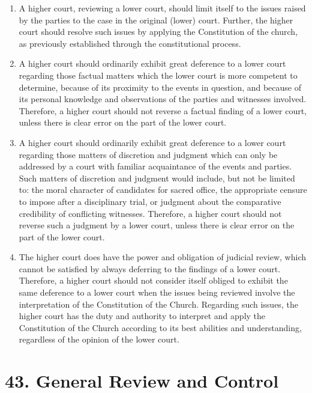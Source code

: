 \documentclass[
]{book}
\providecommand{\tightlist}{%
  \setlength{\itemsep}{0pt}\setlength{\parskip}{0pt}}
\begin{document}
\begin{enumerate}
  \begin{enumerate}
  \def\labelenumii{\alph{enumii}.}
  \tightlist
  \item
    A higher court, reviewing a lower court, should limit itself to the issues raised by the parties to the case in the original (lower) court. Further, the higher court should resolve such issues by applying the Constitution of the church, as previously established through the constitutional process.
  \item
    A higher court should ordinarily exhibit great deference to a lower court regarding those factual matters which the lower court is more competent to determine, because of its proximity to the events in question, and because of its personal knowledge and observations of the parties and witnesses involved. Therefore, a higher court should not reverse a factual finding of a lower court, unless there is clear error on the part of the lower court.
  \item
    A higher court should ordinarily exhibit great deference to a lower court regarding those matters of discretion and judgment which can only be addressed by a court with familiar acquaintance of the events and parties. Such matters of discretion and judgment would include, but not be limited to: the moral character of candidates for sacred office, the appropriate censure to impose after a disciplinary trial, or judgment about the comparative credibility of conflicting witnesses. Therefore, a higher court should not reverse such a judgment by a lower court, unless there is clear error on the part of the lower court.
  \item
    The higher court does have the power and obligation of judicial review, which cannot be satisfied by always deferring to the findings of a lower court. Therefore, a higher court should not consider itself obliged to exhibit the same deference to a lower court when the issues being reviewed involve the interpretation of the Constitution of the Church. Regarding such issues, the higher court has the duty and authority to interpret and apply the Constitution of the Church according to its best abilities and understanding, regardless of the opinion of the lower court.
  \end{enumerate}
\end{enumerate}

\hypertarget{general-review-and-control}{%
\section*{43. General Review and Control}\label{general-review-and-control}}
\end{document}
